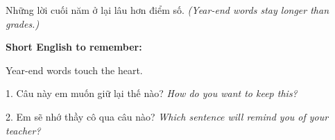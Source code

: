 \begin{baihoc}
Những lời cuối năm ở lại lâu hơn điểm số.
\textit{(Year-end words stay longer than grades.)}
\end{baihoc}

\begin{ghinhoanh}
\textbf{Short English to remember:}

Year-end words touch the heart.

\end{ghinhoanh}

\begin{tuhocnhanh}
1. Câu này em muốn giữ lại thế nào? \textit{How do you want to keep this?}

2. Em sẽ nhớ thầy cô qua câu nào? \textit{Which sentence will remind you of your teacher?}
\end{tuhocnhanh}
\ngancach
